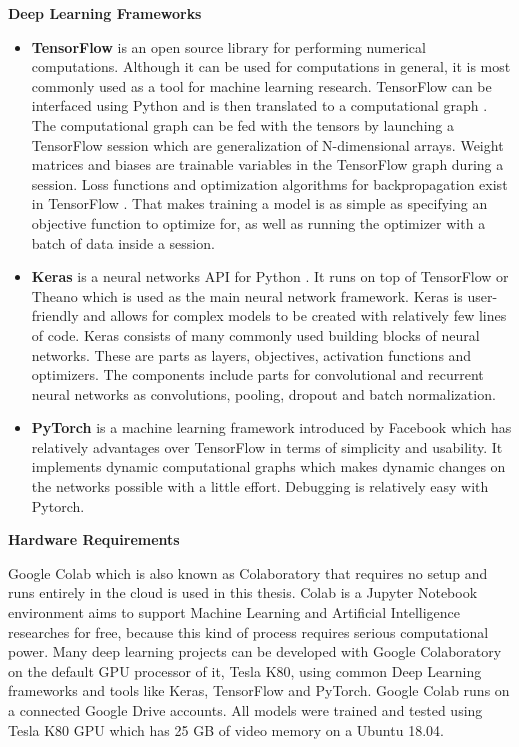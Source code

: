     \textbf{Deep Learning Frameworks}

        \begin{itemize}

            \item \textbf{TensorFlow} is an open source library for performing numerical computations. Although it can be used for computations in general,
                    it is most commonly used as a tool for machine learning research.
                    TensorFlow can be interfaced using Python and is then translated to a computational graph \cite{abadi2015tensorflow}.
                    The computational graph can be fed with the tensors  by launching a TensorFlow session which are generalization of N-dimensional arrays.
                    Weight matrices and biases are trainable variables in the TensorFlow graph during a session.
                    Loss functions and optimization algorithms for backpropagation exist in TensorFlow \cite{johansen2019medical}.
                    That makes training a model is as simple as specifying an objective function to optimize for, as well as running the optimizer with a batch of data inside a session.

            \item \textbf{Keras} is a neural networks API for Python \cite{chollet2015}. It runs on top of TensorFlow or Theano \cite{mohan2019medical}
                    which is used as the main neural network framework. Keras is user-friendly and allows for complex models to be created with relatively few lines of code.
                    Keras consists of many commonly used building blocks of neural networks. These are parts as layers, objectives, activation functions and optimizers.
                    The components include parts for convolutional and recurrent neural networks as convolutions, pooling, dropout and batch normalization.

            \item \textbf{PyTorch} is a machine learning framework introduced by Facebook which has relatively advantages over TensorFlow
                    in terms of simplicity and usability. It implements dynamic computational graphs which makes dynamic changes
                    on the networks possible with a little effort. Debugging is relatively easy with Pytorch.

        \end{itemize}


    \textbf{Hardware Requirements}

        Google Colab which is also known as Colaboratory that requires no setup and runs entirely in the cloud is used in this thesis.
            Colab is a Jupyter Notebook environment aims to support Machine Learning and Artificial Intelligence researches for free,
            because this kind of process requires serious computational power.
            Many deep learning projects can be developed with Google Colaboratory on the default GPU processor of it, Tesla K80, using common Deep Learning frameworks and tools like Keras,
            TensorFlow and PyTorch. Google Colab runs on a connected Google Drive accounts.
            All models were trained and tested using Tesla K80 GPU which has 25 GB of video memory on a Ubuntu 18.04.

